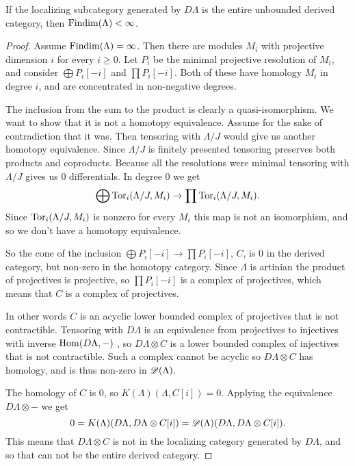 \begin{theorem}\cite[Theorem~4.3]{Rick19}\label{thm:injectives_generate_implies_FDC}
	If the localizing subcategory generated by $D\Lambda$ is the entire unbounded derived category, then $\operatorname{Findim}(\Lambda) < \infty$.
	
	\begin{proof}
		Assume $\operatorname{Findim}(\Lambda) = \infty$. Then there are modules $M_i$ with projective dimension $i$ for every $i \geq 0$. Let $P_i$ be the minimal projective resolution of $M_i$, and consider $\bigoplus P_i[-i]$ and $\prod P_i[-i]$. Both of these have homology $M_i$ in degree $i$, and are concentrated in non-negative degrees.
		
		The inclusion from the sum to the product is clearly a quasi-isomorphism. We want to show that it is not a homotopy equivalence. Assume for the sake of contradiction that it was. Then tensoring with $\Lambda/J$ would give us another homotopy equivalence. Since $\Lambda/J$ is finitely presented tensoring preserves both products and coproducts. Because all the resolutions were minimal tensoring with $\Lambda/J$ gives us 0 differentials. In degree 0 we get $$\bigoplus \operatorname{Tor}_i(\Lambda/J, M_i) \to \prod \operatorname{Tor}_i(\Lambda/J, M_i) .$$
		Since $\operatorname{Tor}_i(\Lambda/J, M_i)$ is nonzero for every $M_i$ this map is not an isomorphism, and so we don't have a homotopy equivalence.
		
		So the cone of the inclusion $\bigoplus P_i[-i] \to \prod P_i[-i]$, $C$, is 0 in the derived category, but non-zero in the homotopy category. Since $\Lambda$ is artinian the product of projectives is projective\cite[Theorem~3.3]{Chase60}, so $\prod P_i[-i]$ is a complex of projectives, which means that $C$ is a complex of projectives. 
		
		In other words $C$ is an acyclic lower bounded complex of projectives that is not contractible. Tensoring with $D\Lambda$ is an equivalence from projectives to injectives with inverse $\operatorname{Hom}(D\Lambda, -)$ , so $D\Lambda \otimes C$ is a lower bounded complex of injectives that is not contractible. Such a complex cannot be acyclic so $D\Lambda \otimes C$ has homology, and is thus non-zero in $\operatorname{\mathscr{D}}(\Lambda)$.
		
		The homology of $C$ is 0, so $K(\Lambda)(\Lambda, C[i]) = 0$. Applying the equivalence $D\Lambda \otimes -$ we get 
		$$0=K(\Lambda)(D\Lambda, D\Lambda \otimes C [i])=\operatorname{\mathscr{D}}(\Lambda)(D\Lambda, D\Lambda \otimes C [i]).$$ 
		This means that $D\Lambda \otimes C$ is not in the localizing category generated by $D\Lambda$, and so that can not be the entire derived category.
	\end{proof}
\end{theorem}

